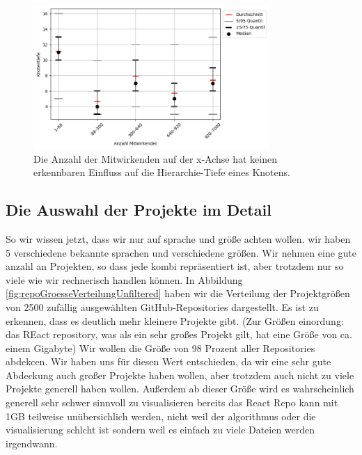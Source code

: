 \begin{figure}
    \centering
    \includegraphics[width=0.8\textwidth]{images/datenanalyse/mitwirkendeVsTiefe.png}
    \caption{Die Anzahl der Mitwirkenden auf der x-Achse hat keinen erkennbaren Einfluss auf die Hierarchie-Tiefe eines Knotens.}
    \label{fig:mitwirkendeVsTiefe}
\end{figure}

\subsection{Die Auswahl der Projekte im Detail} \label{sec:auswahlDerProjekteImDetail}
So wir wissen jetzt, dass wir nur auf sprache und größe achten wollen. wir haben 5 verschiedene bekannte sprachen und verschiedene größen. Wir nehmen eine gute anzahl an Projekten, so dass jede kombi repräsentiert ist, aber trotzdem nur so viele wie wir rechnerisch handlen können. 
In Abbildung \ref{fig:repoGroesseVerteilungUnfiltered} haben wir die Verteilung der Projektgrößen von 2500 zufällig ausgewählten GitHub-Repositories dargestellt. Es ist zu erkennen, dass es deutlich mehr kleinere Projekte gibt. (Zur Größen einordung: das REact repository, was als ein sehr großes Projekt gilt, hat eine Größe von ca.  einem Gigabyte)
Wir wollen die Größe von 98 Prozent aller Repositories abdekcen. Wir haben uns für diesen Wert entschieden, da wir eine sehr gute Abdeckung auch großer Projekte haben wollen, aber trotzdem auch nicht zu viele Projekte generell haben wollen. Außerdem ab dieser Größe wird es wahrscheinlich generell sehr schwer sinnvoll zu visualisieren bereits das React Repo kann mit 1GB teilweise unübersichlich werden, nicht weil der algorithmus oder die visualisierung schlcht ist sondern weil es einfach zu viele Dateien werden irgendwann. %

